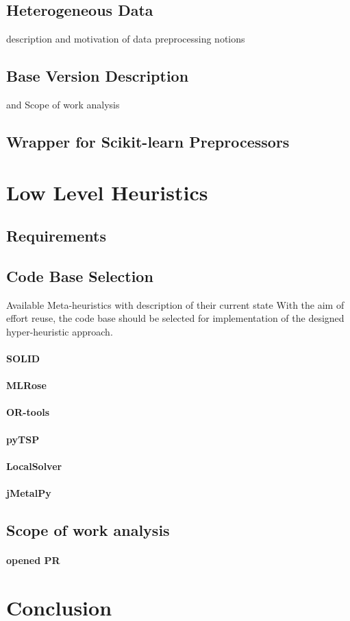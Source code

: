 \subsection{Heterogeneous Data} description and motivation of data preprocessing notions

\subsection{Base Version Description} and Scope of work analysis
\subsection{Wrapper for Scikit-learn Preprocessors}


\section{Low Level Heuristics}\label{Impl: LLH}

\subsection{Requirements}

\subsection{Code Base Selection}\label{implementation:llh code basis selection}
Available Meta-heuristics with description of their current state
With the aim of effort reuse, the code base should be selected for implementation of the designed hyper-heuristic approach.
\paragraph{SOLID}
\paragraph{MLRose}
\paragraph{OR-tools}
\paragraph{pyTSP}
\paragraph{LocalSolver}
\paragraph{jMetalPy}

\subsection{Scope of work analysis}
\paragraph{opened PR}

\section{Conclusion}
